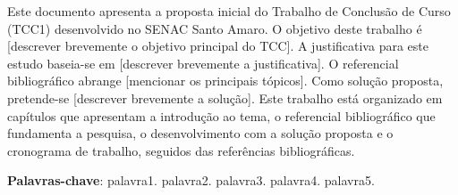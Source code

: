\documentclass[
    12pt,                %
    openright,           %
    oneside,             %
    a4paper,             %
    english,             %
    brazil               %
]{abntex2}
\begin{document}

\frenchspacing

\pretextual

\imprimircapa

\imprimirfolhaderosto

\begin{resumo}
Este documento apresenta a proposta inicial do Trabalho de Conclusão de Curso (TCC1) desenvolvido no SENAC Santo Amaro. O objetivo deste trabalho é [descrever brevemente o objetivo principal do TCC]. A justificativa para este estudo baseia-se em [descrever brevemente a justificativa]. O referencial bibliográfico abrange [mencionar os principais tópicos]. Como solução proposta, pretende-se [descrever brevemente a solução]. Este trabalho está organizado em capítulos que apresentam a introdução ao tema, o referencial bibliográfico que fundamenta a pesquisa, o desenvolvimento com a solução proposta e o cronograma de trabalho, seguidos das referências bibliográficas.

\vspace{\onelineskip}

\noindent
\textbf{Palavras-chave}: palavra1. palavra2. palavra3. palavra4. palavra5.
\end{resumo}

\listoffigures*
\cleardoublepage

\listoftables*
\cleardoublepage
\end{document}
